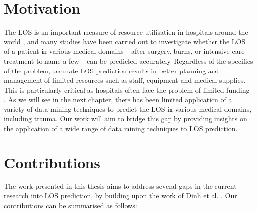 \section{Motivation}
The LOS is an important measure of resource utilisation in hospitals around
the world \citep{Ng2006},
and many studies have been carried out to investigate whether the
LOS of a patient in various medical domains -- after surgery, burns, or
intensive care treatment to name a few -- can be predicted accurately.
Regardless of the
specifics of the problem, accurate LOS prediction results in better planning
and management of limited resources such as staff, equipment and medical
supplies. This is particularly critical as hospitals often face the problem
of limited funding \citep{Walczak2003}.
As we will see in the next chapter, there has been limited
application of a variety of data mining techniques to predict the LOS in
various medical domains, including trauma. Our work will aim to bridge this
gap by providing insights on the application of a wide range of data mining
techniques to LOS prediction.

\section{Contributions}
The work presented in this thesis aims to address several gaps in the current
research into LOS prediction, by building upon the work of Dinh et al.
\citep{Dinh2013a}. Our contributions can be summarised as follows:

